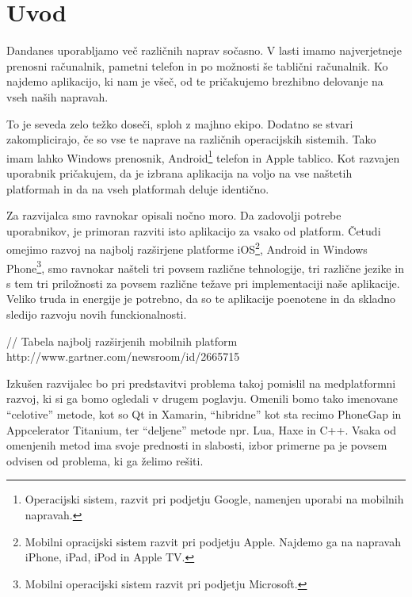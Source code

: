 \graphicspath{{img/}}





\chapter{Uvod}
\label{chap:introduction}


Dandanes uporabljamo več različnih naprav sočasno. V lasti imamo najverjetneje prenosni računalnik, pametni telefon in po možnosti še tablični računalnik. Ko najdemo aplikacijo, ki nam je všeč, od te pričakujemo brezhibno delovanje na vseh naših napravah.

To je seveda zelo težko doseči, sploh z majhno ekipo. Dodatno se stvari zakomplicirajo, če so vse te naprave na različnih operacijskih sistemih. Tako imam lahko Windows prenosnik, Android\footnote{Operacijski sistem, razvit pri podjetju Google, namenjen uporabi na mobilnih napravah.} telefon in Apple tablico. Kot razvajen uporabnik pričakujem, da je izbrana aplikacija na voljo na vse naštetih platformah in da na vseh platformah deluje identično.

Za razvijalca smo ravnokar opisali nočno moro. Da zadovolji potrebe uporabnikov, je primoran razviti isto aplikacijo za vsako od platform. Četudi omejimo razvoj na najbolj razširjene platforme iOS\footnote{Mobilni opracijski sistem razvit pri podjetju Apple. Najdemo ga na napravah iPhone, iPad, iPod in Apple TV.}, Android in Windows Phone\footnote{Mobilni operacijski sistem razvit pri podjetju Microsoft.}, smo ravnokar našteli tri povsem različne tehnologije, tri različne jezike in s tem tri priložnosti za povsem različne težave pri implementaciji naše aplikacije. Veliko truda in energije je potrebno, da so te aplikacije poenotene in da skladno sledijo razvoju novih funckionalnosti.

// Tabela najbolj razširjenih mobilnih platform http://www.gartner.com/newsroom/id/2665715

Izkušen razvijalec bo pri predstavitvi problema takoj pomislil na medplatformni razvoj, ki si ga bomo ogledali v drugem poglavju. Omenili bomo tako imenovane ``celotive'' metode, kot so Qt\cite{qt} in Xamarin\cite{xamarin}, ``hibridne'' kot sta recimo PhoneGap\cite{phonegap} in Appcelerator Titanium\cite{titanium}, ter ``deljene'' metode npr. Lua\cite{lua}, Haxe\cite{haxe} in C++\cite{cpp}. Vsaka od omenjenih metod ima svoje prednosti in slabosti, izbor primerne pa je povsem odvisen od problema, ki ga želimo rešiti.


